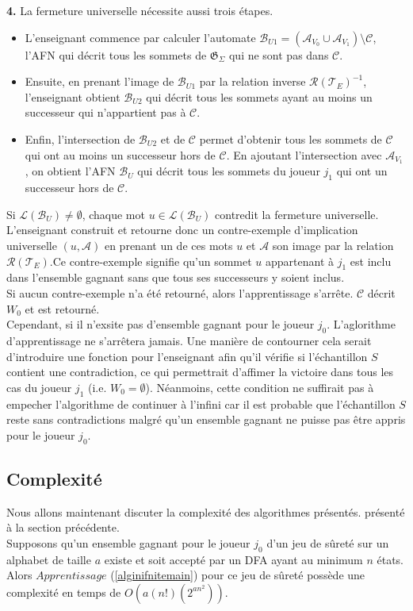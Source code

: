 \documentclass[12pt,a4paper,oneside,titlepage]{report}
\begin{document}
\noindent\textbf{4.} La fermeture universelle nécessite aussi trois étapes.
\begin{itemize}
\item L'enseignant commence par calculer l'automate $\mathcal{B}_{U1}=(\mathcal{A}_{V_0}\cup\mathcal{A}_{V_1})\setminus\mathcal{C}$, l'AFN qui décrit tous les sommets de $\mathfrak{G}_\Sigma$ qui ne sont pas dans $\mathcal{C}$. 
\item Ensuite, en prenant l'image de $\mathcal{B}_{U1}$ par la relation inverse $\mathcal{R}(\mathcal{T}_E)^{-1}$, l'enseignant obtient $\mathcal{B}_{U2}$ qui décrit tous les sommets ayant au moins un successeur qui n'appartient pas à $\mathcal{C}$. 
\item Enfin, l'intersection de $\mathcal{B}_{U2}$ et de $\mathcal{C}$ permet d'obtenir tous les sommets de $\mathcal{C}$ qui ont au moins un successeur hors de $\mathcal{C}$. En ajoutant l'intersection avec $\mathcal{A}_{V_1}$, on obtient l'AFN $\mathcal{B}_U$ qui décrit tous les sommets du joueur $j_1$ qui ont un successeur hors de $\mathcal{C}$. 
\end{itemize}
Si $\mathcal{L}(\mathcal{B}_U)\neq\emptyset$, chaque mot $u\in\mathcal{L}(\mathcal{B}_U)$ contredit la fermeture universelle. L'enseignant construit et retourne donc un contre-exemple d'implication universelle $(u,\mathcal{A})$ en prenant un de ces mots $u$ et $\mathcal{A}$ son image par la relation $\mathcal{R}(\mathcal{T}_E)$.Ce contre-exemple signifie qu'un sommet $u$ appartenant à $j_1$ est inclu dans l'ensemble gagnant sans que tous ses successeurs y soient inclus.\\

\noindent Si aucun contre-exemple n'a été retourné, alors l'apprentissage s'arrête. $\mathcal{C}$ décrit $W_0$ et est retourné.\\

Cependant, si il n'exsite pas d'ensemble gagnant pour le joueur $j_0$. L'aglorithme d'apprentissage ne s'arrêtera jamais. Une manière de contourner cela serait d'introduire une fonction pour l'enseignant afin qu'il vérifie si l'échantillon $S$ contient une contradiction, ce qui permettrait d'affimer la victoire dans tous les cas du joueur $j_1$ (i.e. $W_0=\emptyset$). Néanmoins, cette condition ne suffirait pas à empecher l'algorithme de continuer à l'infini car il est probable que l'échantillon $S$ reste sans contradictions malgré qu'un ensemble gagnant ne puisse pas être appris pour le joueur $j_0$.

\subsection{Complexité}
Nous allons maintenant discuter la complexité des algorithmes présentés.  présenté à la section précédente.\\
Supposons qu'un ensemble gagnant pour le joueur $j_0$ d'un jeu de sûreté sur un alphabet de taille $a$ existe et soit accepté par un DFA ayant au minimum $n$ états. Alors $Apprentissage$ (\ref{alginifnitemain}) pour ce jeu de sûreté possède une complexité en temps de $O(a(n!)(2^{an^2}))$.\\
\end{document}
